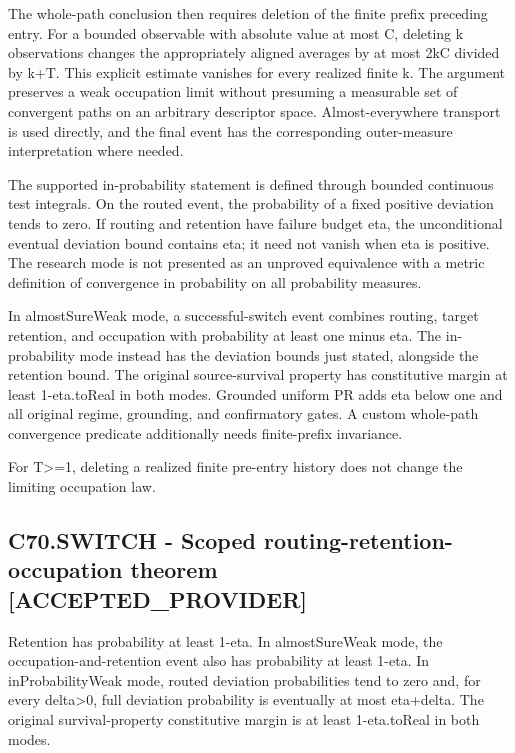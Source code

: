 \documentclass[11pt,a4paper]{article}
\newcommand{\companionEquation}[1]{\begin{center}\sbox{\companionEqBox}{$\displaystyle #1$}\ifdim\wd\companionEqBox>\linewidth\resizebox{\linewidth}{!}{\usebox{\companionEqBox}}\else\usebox{\companionEqBox}\fi\end{center}}
\begin{document}
The whole-path conclusion then requires deletion of the finite prefix preceding entry. For a bounded observable with absolute value at most C, deleting k observations changes the appropriately aligned averages by at most 2kC divided by k+T. This explicit estimate vanishes for every realized finite k. The argument preserves a weak occupation limit without presuming a measurable set of convergent paths on an arbitrary descriptor space. Almost-everywhere transport is used directly, and the final event has the corresponding outer-measure interpretation where needed.

The supported in-probability statement is defined through bounded continuous test integrals. On the routed event, the probability of a fixed positive deviation tends to zero. If routing and retention have failure budget eta, the unconditional eventual deviation bound contains eta; it need not vanish when eta is positive. The research mode is not presented as an unproved equivalence with a metric definition of convergence in probability on all probability measures.

In almostSureWeak mode, a successful-switch event combines routing, target retention, and occupation with probability at least one minus eta. The in-probability mode instead has the deviation bounds just stated, alongside the retention bound. The original source-survival property has constitutive margin at least 1-eta.toReal in both modes. Grounded uniform PR adds eta below one and all original regime, grounding, and confirmatory gates. A custom whole-path convergence predicate additionally needs finite-prefix invariance.

\companionEquation{\left|\int f\,d\widehat{\nu}_{k+T}(w)-\int f\,d\widehat{\nu}_T(\theta_k w)\right|\leq \frac{2kC}{k+T},\qquad |f|\leq C.}
{\small For T>=1, deleting a realized finite pre-entry history does not change the limiting occupation law.}
\subsection*{C70.SWITCH - Scoped routing-rete\allowbreak{}ntion-occupa\allowbreak{}tion theorem [ACCEPTED\_PROVIDER]}
Retention has probability at least 1-eta. In almostSureWeak mode, the occupation-and-retention event also has probability at least 1-eta. In inProbabilityWeak mode, routed deviation probabilities tend to zero and, for every delta>0, full deviation probability is eventually at most eta+delta. The original survival-property constitutive margin is at least 1-eta.toReal in both modes.
\end{document}

